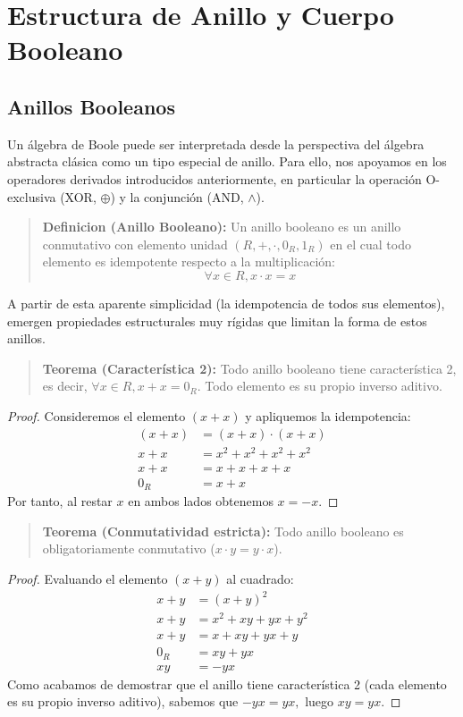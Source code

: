 \chapter{Estructura de Anillo y Cuerpo Booleano}

\section{Anillos Booleanos}
Un álgebra de Boole puede ser interpretada desde la perspectiva del álgebra abstracta clásica como un tipo especial de anillo. Para ello, nos apoyamos en los operadores derivados introducidos anteriormente, en particular la operación O-exclusiva (XOR, $\oplus$) y la conjunción (AND, $\wedge$).

\begin{quote}\textbf{Definicion (Anillo Booleano):}\label{def_anillo_booleano_cap}
Un anillo booleano es un anillo conmutativo con elemento unidad $(R, +, \cdot, 0_R, 1_R)$ en el cual todo elemento es idempotente respecto a la multiplicación:
\[ \forall x \in R, x \cdot x = x \]
\end{quote}

A partir de esta aparente simplicidad (la idempotencia de todos sus elementos), emergen propiedades estructurales muy rígidas que limitan la forma de estos anillos.

\begin{quote}\textbf{Teorema (Característica 2):}\label{caracteristica_dos}
Todo anillo booleano tiene característica 2, es decir, $\forall x \in R, x + x = 0_R.$ Todo elemento es su propio inverso aditivo.
\end{quote}
\begin{proof}
Consideremos el elemento $(x+x)$ y apliquemos la idempotencia:
\begin{align*}
(x + x) &= (x + x) \cdot (x + x) \\
x + x &= x^2 + x^2 + x^2 + x^2 \\
x + x &= x + x + x + x \\
0_R &= x + x
\end{align*}
Por tanto, al restar $x$ en ambos lados obtenemos $x = -x.$
\end{proof}

\begin{quote}\textbf{Teorema (Conmutatividad estricta):}\label{conmutatividad_estricta}
Todo anillo booleano es obligatoriamente conmutativo ($x \cdot y = y \cdot x$).
\end{quote}
\begin{proof}
Evaluando el elemento $(x+y)$ al cuadrado:
\begin{align*}
x + y &= (x + y)^2 \\
x + y &= x^2 + xy + yx + y^2 \\
x + y &= x + xy + yx + y \\
0_R &= xy + yx \\
xy &= -yx
\end{align*}
Como acabamos de demostrar que el anillo tiene característica 2 (cada elemento es su propio inverso aditivo), sabemos que $-yx = yx,$ luego $xy = yx.$
\end{proof}


